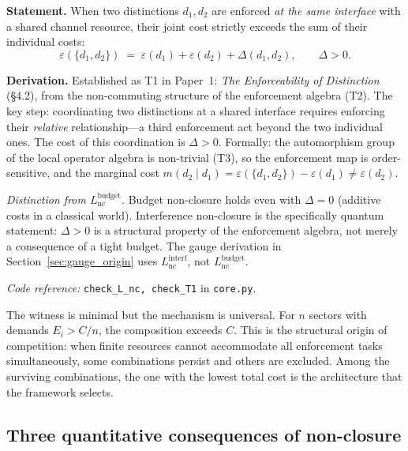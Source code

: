 \documentclass[11pt]{article}
\newcommand{\coderef}[2]{\smallskip\noindent\textit{Code reference:} \texttt{#1} in \texttt{#2}.}
\begin{document}
\begin{tcolorbox}[apfbox, title={Lemma $L_{\mathrm{nc}}^{\mathrm{interf}}$ (Interference Non-Closure)}]
\textbf{Statement.}  When two distinctions $d_1, d_2$ are enforced \emph{at the same interface} with a shared channel resource, their joint cost strictly exceeds the sum of their individual costs:
\begin{equation}
\varepsilon(\{d_1, d_2\}) \;=\; \varepsilon(d_1) + \varepsilon(d_2) + \Delta(d_1, d_2), \qquad \Delta > 0.
\label{eq:superadditivity}
\end{equation}

\smallskip\noindent\textbf{Derivation.}  Established as T1 in Paper~1: \emph{The Enforceability of Distinction} (\S4.2), from the non-commuting structure of the enforcement algebra (T2).  The key step: coordinating two distinctions at a shared interface requires enforcing their \emph{relative} relationship---a third enforcement act beyond the two individual ones.  The cost of this coordination is $\Delta > 0$.  Formally: the automorphism group of the local operator algebra is non-trivial (T3), so the enforcement map is order-sensitive, and the marginal cost $m(d_2 \mid d_1) = \varepsilon(\{d_1,d_2\}) - \varepsilon(d_1) \ne \varepsilon(d_2)$.

\smallskip\noindent\textit{Distinction from $L_{\mathrm{nc}}^{\mathrm{budget}}$.}  Budget non-closure holds even with $\Delta = 0$ (additive costs in a classical world).  Interference non-closure is the specifically quantum statement: $\Delta > 0$ is a structural property of the enforcement algebra, not merely a consequence of a tight budget.  The gauge derivation in Section~\ref{sec:gauge_origin} uses $L_{\mathrm{nc}}^{\mathrm{interf}}$, not $L_{\mathrm{nc}}^{\mathrm{budget}}$.

\coderef{check\_L\_nc, check\_T1}{core.py}
\end{tcolorbox}

The witness is minimal but the mechanism is universal.  For $n$ sectors with demands $E_i > C/n$, the composition exceeds $C$.  This is the structural origin of competition: when finite resources cannot accommodate all enforcement tasks simultaneously, some combinations persist and others are excluded.  Among the surviving combinations, the one with the lowest total cost is the architecture that the framework selects.

\subsection{Three quantitative consequences of non-closure}
\end{document}
